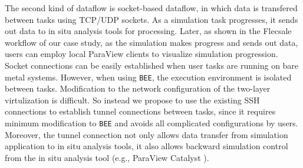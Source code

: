 The second kind of dataflow is socket-based dataflow, in which data is transfered between tasks using TCP/UDP sockets. As a simulation task progresses, it sends out data to in situ analysis tools for processing. Later, as shown in the Flecsale workflow of our case study, as the simulation makes progress and sends out data, users can employ local ParaView clients to visualize simulation progression. Socket connections can be easily established when user tasks are running on bare metal systems. However, when using \texttt{BEE}, the execution environment is isolated between tasks. Modification to the network configuration of the two-layer virtulization is difficult. So instead we propose to use the existing SSH connections to establish tunnel connections between tasks, since it requires minimum modification to \texttt{BEE} and avoids all complicated configurations by users. Moreover, the tunnel connection not only allows data transfer from simulation application to in situ analysis tools, it also allows backward simulation control from the in situ analysis tool (e.g., ParaView Catalyst \cite{ahrens2005paraview, ayachit2015paraview}).

